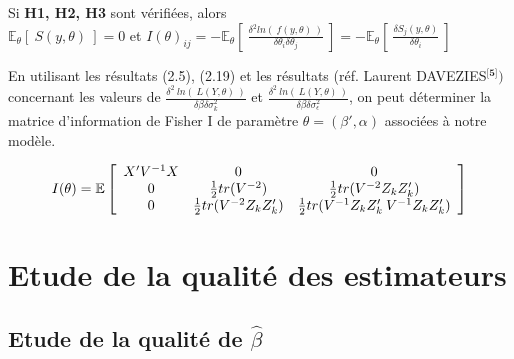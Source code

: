 \documentclass[11pt,fleqn]{book} %
\begin{document}
\vspace{2em}

\begin{theorem} Si \textbf{H1, H2, H3} sont vérifiées, alors \\

 $\mathbb{E}_\theta\left[\:S(y,\theta) \:\right]=0 $ \:et\: $ I(\theta)_{ij}=-\mathbb{E}_\theta\left[\: \frac{\delta^2 ln(\:f(y,\theta)\:)}{\delta \theta_i \delta\theta_j} \:\right]=-\mathbb{E}_\theta\left[\:\frac{\delta  S_j(y,\theta)}{\delta\theta_i}\:\right]$
 \end{theorem}

\vspace{4em}

En utilisant les résultats (2.5), (2.19) et les résultats (réf. Laurent DAVEZIES$^\textbf{[5]})$ concernant les valeurs de $\frac{\delta^2\: ln( \:\textit{L}(Y,\theta)\:)}{\delta \beta \delta \sigma_k^2 }$ et $\frac{\delta^2\: ln( \:\textit{L}(Y,\theta)\:)}{\delta \beta \delta \sigma_{\epsilon}^2 }$, on peut déterminer la matrice d'information de Fisher I de paramètre $\theta=(\beta',\alpha)$  associées à notre modèle.
 
 \[
 I(\theta)=\mathbb{E}\left[
  \begin{array}{ c c c}
  X'V^{-1}X & 0 & 0  \\
  0 & \frac{1}{2}tr(V^{-2}) & \frac{1}{2}tr(V^{-2} Z_k Z_k') \\
  0 & \frac{1}{2}tr(V^{-2} Z_k Z_k') & \frac{1}{2}tr(V^{-1} Z_k Z_k'\:V^{-1} Z_k Z_k')
  \end{array} \right]
  \]
  

\newpage

\section{Etude de la qualité des estimateurs}

\vspace{1em}

\subsection{Etude de la qualité de $\hat{\beta}$}
\end{document}
